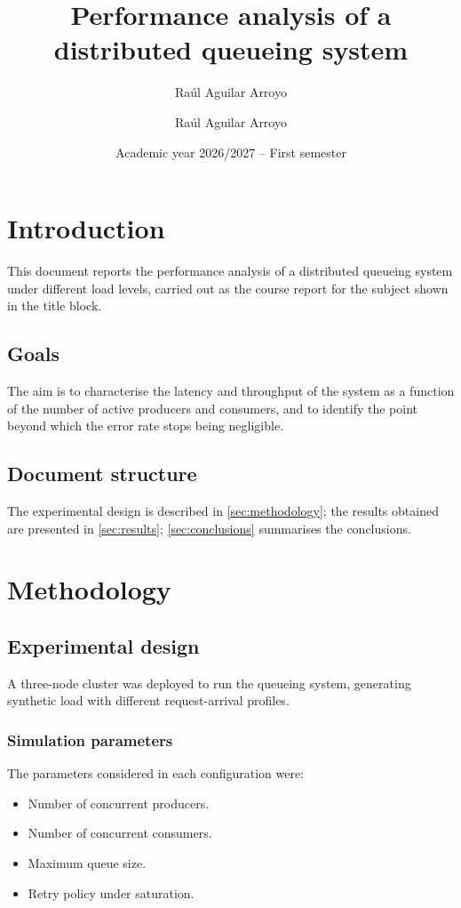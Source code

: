 \documentclass[11pt,twoside]{article}
\title{Performance analysis of a distributed queueing system}
\author{Raúl Aguilar Arroyo \and Raúl Aguilar Arroyo}
\date{Academic year 2026/2027 -- First semester}
\begin{document}
\maketitle

\section{Introduction}

This document reports the performance analysis of a distributed queueing
system under different load levels, carried out as the course report for
the subject shown in the title block.

\subsection{Goals}

The aim is to characterise the latency and throughput of the system as a
function of the number of active producers and consumers, and to identify
the point beyond which the error rate stops being negligible.

\subsection{Document structure}

The experimental design is described in \autoref{sec:methodology};
the results obtained are presented in \autoref{sec:results};
\autoref{sec:conclusions} summarises the conclusions.

\section{Methodology}
\label{sec:methodology}

\subsection{Experimental design}

A three-node cluster was deployed to run the queueing system, generating
synthetic load with different request-arrival profiles.

\subsubsection{Simulation parameters}

The parameters considered in each configuration were:

\begin{itemize}
  \item Number of concurrent producers.
  \item Number of concurrent consumers.
  \item Maximum queue size.
  \item Retry policy under saturation.
\end{itemize}
\end{document}
